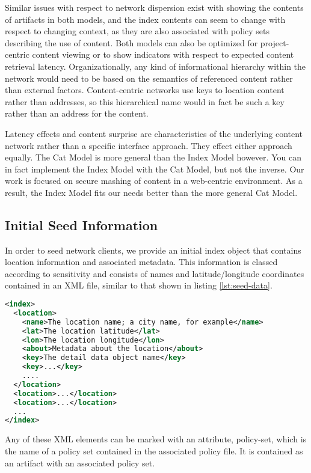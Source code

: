 Similar issues with respect to network dispersion exist with showing the contents of artifacts in both models, and the index contents can seem to change with respect to changing context, as they are also associated with policy sets describing the use of content.  Both models can also be optimized for project-centric content viewing or to show indicators with respect to expected content retrieval latency.  Organizationally, any kind of informational hierarchy within the network would need to be based on the semantics of referenced content rather than external factors.  Content-centric networks use keys to location content rather than addresses, so this hierarchical name would in fact be such a key rather than an address for the content.

Latency effects and content surprise are characteristics of the underlying content network rather than a specific interface approach.  They effect either approach equally.  The Cat Model is more general than the Index Model however.  You can in fact implement the Index Model with the Cat Model, but not the inverse.  
Our work is focused on secure mashing of content in a web-centric environment.  As a result, the Index Model fits our needs better than the more general Cat Model.

\subsection{Initial Seed Information}
In order to seed network clients, we provide an initial index object that contains location information and associated metadata.  This information is classed according to sensitivity and consists of names and latitude/longitude coordinates contained in an XML file, similar to that shown in listing \ref{lst:seed-data}.

\begin{lstlisting}[language=xml, label=lst:seed-data, caption=Seed Information for the Network]
<index>
  <location>
    <name>The location name; a city name, for example</name>
    <lat>The location latitude</lat>
    <lon>The location longitude</lon>
    <about>Metadata about the location</about>
    <key>The detail data object name</key>
    <key>...</key>
    ....
  </location>
  <location>...</location>
  <location>...</location>
  ...
</index>
\end{lstlisting}

Any of these XML elements can be marked with an attribute, policy-set, which is the name of a policy set contained in the associated policy file.  It is contained as an artifact with an associated policy set.

